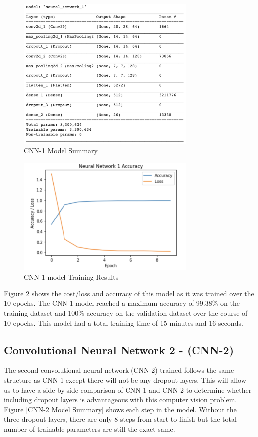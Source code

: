 \documentclass[5p,authoryear]{elsarticle}
\begin{document}
\begin{figure}[!htb] \centering
	\includegraphics[width=3.4in]{figures/CNN-1-Summary.png}
	\caption[]{CNN-1 Model Summary} 
	\label{CNN-1 Model Summary} 
\end{figure}


\begin{figure}[!htb] \centering
	\includegraphics[width=3.4in]{figures/CNN-1-training.png}
	\caption[]{CNN-1 model Training Results} 
	\label{CNN-1 model Training Results} 
\end{figure}


Figure \ref{CNN-1 model Training Results} shows the cost/loss and accuracy of this model as it was trained over the 10 epochs. The CNN-1 model reached a maximum accuracy of 99.38\% on the training dataset and 100\% accuracy on the validation dataset over the course of 10 epochs. This model had a total training time of 15 minutes and 16 seconds.  


\subsection{Convolutional Neural Network 2 - (CNN-2)}

The second convolutional neural network (CNN-2) trained follows the same structure as CNN-1 except there will not be any dropout layers. This will allow us to have a side by side comparison of CNN-1 and CNN-2 to determine whether including dropout layers is advantageous with this computer vision problem. Figure \ref{CNN-2 Model Summary} shows each step in the model. Without the three dropout layers, there are only 8 steps from start to finish but the total number of trainable parameters are still the exact same.
\end{document}
